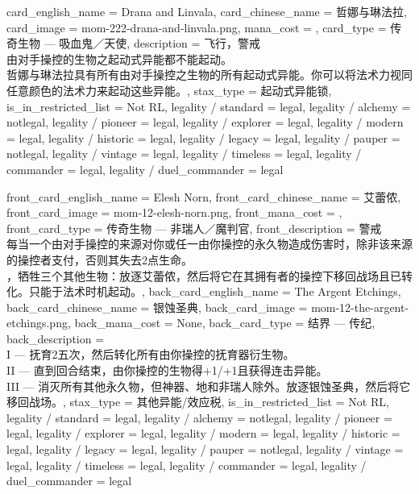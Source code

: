 \documentclass[lang = cn, color = black, 10pt]{AllThatStax}
\begin{document}
\card
{
	card_english_name = {Drana and Linvala},
	card_chinese_name = {哲娜与琳法拉},
	card_image = mom-222-drana-and-linvala.png,
	mana_cost = ,
	card_type = 传奇生物 — 吸血鬼／天使,
	description = {飞行，警戒\\
		由对手操控的生物之起动式异能都不能起动。\\
		哲娜与琳法拉具有所有由对手操控之生物的所有起动式异能。你可以将法术力视同任意颜色的法术力来起动这些异能。},
	stax_type = 起动式异能锁,
	is_in_restricted_list = Not RL,
	legality / standard = legal,
	legality / alchemy = notlegal,
	legality / pioneer = legal,
	legality / explorer = legal,
	legality / modern = legal,
	legality / historic = legal,
	legality / legacy = legal,
	legality / pauper = notlegal,
	legality / vintage = legal,
	legality / timeless = legal,
	legality / commander = legal,
	legality / duel_commander = legal
}

\mfcard
{
	front_card_english_name = {Elesh Norn},
	front_card_chinese_name = {艾蕾侬},
	front_card_image = mom-12-elesh-norn.png,
	front_mana_cost = ,
	front_card_type = 传奇生物 — 非瑞人／魔判官,
	front_description = {警戒\\
		每当一个由对手操控的来源对你或任一由你操控的永久物造成伤害时，除非该来源的操控者支付，否则其失去2点生命。\\
		，牺牲三个其他生物：放逐艾蕾侬，然后将它在其拥有者的操控下移回战场且已转化。只能于法术时机起动。},
	back_card_english_name = {The Argent Etchings},
	back_card_chinese_name = {银蚀圣典},
	back_card_image = mom-12-the-argent-etchings.png,
	back_mana_cost = None,
	back_card_type = 结界 — 传纪,
	back_description = {\\
		I — 抚育2五次，然后转化所有由你操控的抚育器衍生物。\\
		II — 直到回合结束，由你操控的生物得+1/+1且获得连击异能。\\
		III — 消灭所有其他永久物，但神器、地和非瑞人除外。放逐银蚀圣典，然后将它移回战场。},
	stax_type = 其他异能/效应税,
	is_in_restricted_list = Not RL,
	legality / standard = legal,
	legality / alchemy = notlegal,
	legality / pioneer = legal,
	legality / explorer = legal,
	legality / modern = legal,
	legality / historic = legal,
	legality / legacy = legal,
	legality / pauper = notlegal,
	legality / vintage = legal,
	legality / timeless = legal,
	legality / commander = legal,
	legality / duel_commander = legal
}
\end{document}
